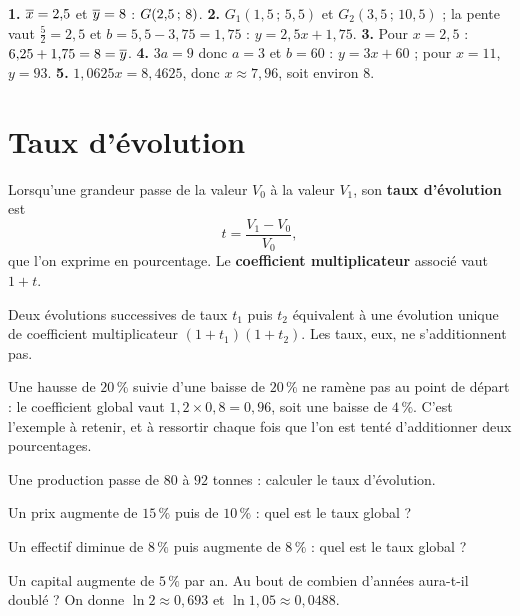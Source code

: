 \begin{corrige}
\textbf{1.} $\overline{x} = 2{,}5$ et $\overline{y} = 8$ : $G(2{,}5\,;\,8)$.
\textbf{2.} $G_{1}(1{,}5\,;\,5{,}5)$ et $G_{2}(3{,}5\,;\,10{,}5)$ ; la
pente vaut $\frac{5}{2} = 2{,}5$ et $b = 5{,}5-3{,}75 = 1{,}75$ :
$y = 2{,}5x+1{,}75$.
\textbf{3.} Pour $x = 2{,}5$ : $6{,}25+1{,}75 = 8 = \overline{y}$. \checkmark
\textbf{4.} $3a = 9$ donc $a = 3$ et $b = 60$ : $y = 3x+60$ ; pour
$x = 11$, $y = 93$.
\textbf{5.} $1{,}0625x = 8{,}4625$, donc $x \approx 7{,}96$, soit environ
$8$.
\end{corrige}

\section{Taux d'évolution}

\begin{definition}
Lorsqu'une grandeur passe de la valeur $V_{0}$ à la valeur $V_{1}$, son
\textbf{taux d'évolution} est
\[
  t = \frac{V_{1}-V_{0}}{V_{0}},
\]
que l'on exprime en pourcentage. Le \textbf{coefficient multiplicateur}
associé vaut $1+t$.
\end{definition}

\begin{propriete}
Deux évolutions successives de taux $t_{1}$ puis $t_{2}$ équivalent à une
évolution unique de coefficient multiplicateur
$\left(1+t_{1}\right)\left(1+t_{2}\right)$. Les taux, eux, ne s'additionnent
pas.
\end{propriete}

\begin{erreurclassique}
Une hausse de $20\,\%$ suivie d'une baisse de $20\,\%$ ne ramène pas au
point de départ : le coefficient global vaut
$1{,}2\times0{,}8 = 0{,}96$, soit une baisse de $4\,\%$. C'est l'exemple à
retenir, et à ressortir chaque fois que l'on est tenté d'additionner deux
pourcentages.
\end{erreurclassique}

\begin{entrainement}[pourcentages]
\exo[\niveau{1}] Une production passe de $80$ à $92$ tonnes : calculer le
taux d'évolution.

\exo[\niveau{2}] Un prix augmente de $15\,\%$ puis de $10\,\%$ : quel est le
taux global ?

\exo[\niveau{2}] Un effectif diminue de $8\,\%$ puis augmente de $8\,\%$ :
quel est le taux global ?

\exo[\niveau{3}] Un capital augmente de $5\,\%$ par an. Au bout de combien
d'années aura-t-il doublé ? On donne $\ln 2 \approx 0{,}693$ et
$\ln 1{,}05 \approx 0{,}0488$.
\end{entrainement}

